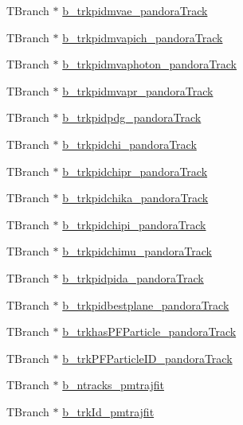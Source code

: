 \begin{DoxyCompactItemize}
\item 
T\-Branch $\ast$ \hyperlink{classanatree_a7b901d4df3119547ad3f6a8b9c09bb80}{b\-\_\-trkpidmvae\-\_\-pandora\-Track}
\item 
T\-Branch $\ast$ \hyperlink{classanatree_abab57531ca161288dec06c6c678344de}{b\-\_\-trkpidmvapich\-\_\-pandora\-Track}
\item 
T\-Branch $\ast$ \hyperlink{classanatree_a53bf5d9835d4fc61762f0049955d2621}{b\-\_\-trkpidmvaphoton\-\_\-pandora\-Track}
\item 
T\-Branch $\ast$ \hyperlink{classanatree_a9a8d8fee5ba81cc3db424a0f899c05c9}{b\-\_\-trkpidmvapr\-\_\-pandora\-Track}
\item 
T\-Branch $\ast$ \hyperlink{classanatree_a245620b28a0541c6a096ab2783d26ba6}{b\-\_\-trkpidpdg\-\_\-pandora\-Track}
\item 
T\-Branch $\ast$ \hyperlink{classanatree_af7835b48b7035a4388baac75dddcda40}{b\-\_\-trkpidchi\-\_\-pandora\-Track}
\item 
T\-Branch $\ast$ \hyperlink{classanatree_a992ceb21d01762710cbceeeea8121e1a}{b\-\_\-trkpidchipr\-\_\-pandora\-Track}
\item 
T\-Branch $\ast$ \hyperlink{classanatree_a3680e58f1171adfe074e3150c282b194}{b\-\_\-trkpidchika\-\_\-pandora\-Track}
\item 
T\-Branch $\ast$ \hyperlink{classanatree_aa7e82ff617304684607f87b3e4af3f73}{b\-\_\-trkpidchipi\-\_\-pandora\-Track}
\item 
T\-Branch $\ast$ \hyperlink{classanatree_ad6ce539e70ae297ffe986e93a0ff8450}{b\-\_\-trkpidchimu\-\_\-pandora\-Track}
\item 
T\-Branch $\ast$ \hyperlink{classanatree_a4f90841d6ff60ac22137e2bf9abe6b6b}{b\-\_\-trkpidpida\-\_\-pandora\-Track}
\item 
T\-Branch $\ast$ \hyperlink{classanatree_ad917a19da9b5840ed834b682c57a8d79}{b\-\_\-trkpidbestplane\-\_\-pandora\-Track}
\item 
T\-Branch $\ast$ \hyperlink{classanatree_a05c70e021e024a1915de70f58afbd422}{b\-\_\-trkhas\-P\-F\-Particle\-\_\-pandora\-Track}
\item 
T\-Branch $\ast$ \hyperlink{classanatree_ae4bfbd92a467559a355e5092af30b46b}{b\-\_\-trk\-P\-F\-Particle\-I\-D\-\_\-pandora\-Track}
\item 
T\-Branch $\ast$ \hyperlink{classanatree_a4277265208cbc22ab65154db98d20ed4}{b\-\_\-ntracks\-\_\-pmtrajfit}
\item 
T\-Branch $\ast$ \hyperlink{classanatree_a56ec5e0a46e5ebae17574ee67192fa7e}{b\-\_\-trk\-Id\-\_\-pmtrajfit}

\end{DoxyCompactItemize}

